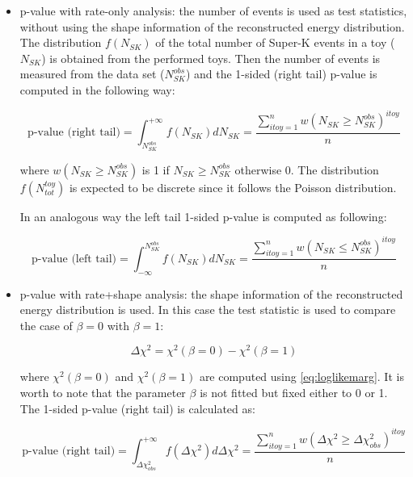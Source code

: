 \begin{itemize}

\item p-value with rate-only analysis: the number of events is used as test statistics, without using the shape information of the reconstructed energy 
	distribution. The distribution $f(N_{SK})$ of the total number of Super-K events in a toy ($N_{SK}$) is obtained from the performed toys. 
	Then the number of events is measured from the data set ($N_{SK}^{obs}$) and
	the 1-sided (right tail) p-value is computed in the following way: 	
	
	\begin{equation}
	\text{p-value (right tail)} = \int_{N_{SK}^{obs}}^{+\infty} f(N_{SK}) d N_{SK}  = 
		\frac{ \sum_{ itoy=1 }^{n} w(N_{SK} \geq N_{SK}^{obs} )^{itoy} }{ n }
	\end{equation}
	\label{eq:pvalue_rateonly}
	
	where $w(N_{SK} \geq N_{SK}^{obs})$ is 1 if $N_{SK} \geq N_{SK}^{obs}$ otherwise 0.
	The distribution $f(N_{tot}^{toy})$ is expected to be discrete since it follows the Poisson distribution.
			 
	In an analogous way the left tail 1-sided p-value is computed as following:
		
	\begin{equation}
	\text{p-value (left tail)} = \int^{N_{SK}^{obs}}_{-\infty} f(N_{SK}) d N_{SK}  = 
		\frac{ \sum_{ itoy=1 }^{n} w(N_{SK} \leq N_{SK}^{obs} )^{itoy} }{ n }
	\end{equation}
	\label{eq:pvalue_rateonly}
		 
\item p-value with rate+shape analysis: the shape information of the reconstructed energy distribution is used.
	In this case the test statistic is used to compare the case of $\beta=0$ with $\beta=1$:
	
	\begin{equation}
	\Delta \chi^2 = \chi^2(\beta=0) - \chi^2(\beta=1)
	\end{equation}
	\label{eq:deltachisq_rateshape}

	where $\chi^2(\beta=0)$ and $\chi^2(\beta=1)$ are computed using \cref{eq:loglikemarg}.
	It is worth to note that the parameter $\beta$ is not fitted but fixed either to 0 or 1.
	The 1-sided p-value (right tail) is calculated as:

	\begin{equation}
	\text{p-value (right tail)} = \int_{\Delta \chi^2_{obs}}^{+\infty} f(\Delta \chi^2) d \Delta \chi^2  = 
		\frac{ \sum_{ itoy=1 }^{n} w(\Delta \chi^2 \geq \Delta \chi^2_{obs} )^{itoy} }{ n }
	\end{equation}
	\label{eq:pvalue_rateonly}
	

\end{itemize}
